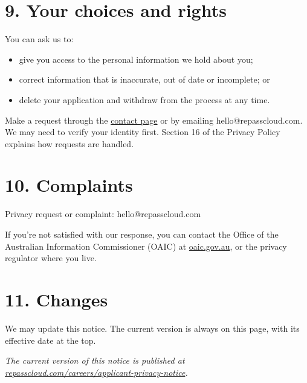 \documentclass[11pt]{article}
\providecommand{\tightlist}{\setlength{\itemsep}{0pt}\setlength{\parskip}{0pt}}
\begin{document}
\section*{9. Your choices and rights}

You can ask us to:

\begin{itemize}
\tightlist
\item
  give you access to the personal information we hold about you;
\item
  correct information that is inaccurate, out of date or incomplete; or
\item
  delete your application and withdraw from the process at any time.
\end{itemize}

Make a request through the \href{https://repasscloud.com/contact/}{contact page} or by emailing hello@repasscloud.com. We may need to verify your identity first. Section 16 of the Privacy Policy explains how requests are handled.

\section*{10. Complaints}

Privacy request or complaint: hello@repasscloud.com

If you're not satisfied with our response, you can contact the Office of the Australian Information Commissioner (OAIC) at \href{https://www.oaic.gov.au}{oaic.gov.au}, or the privacy regulator where you live.

\section*{11. Changes}

We may update this notice. The current version is always on this page, with its effective date at the top.

\vspace{8pt}
\textit{The current version of this notice is published at \href{https://repasscloud.com/careers/applicant-privacy-notice/}{repasscloud.com/careers/applicant-privacy-notice}.}
\end{document}

